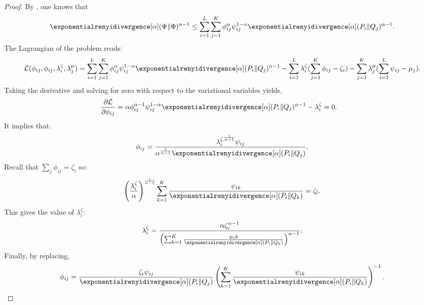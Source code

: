\begin{proof}
    By , one knows that
    \begin{align*}
        \exponentialrenyidivergence[\alpha](\Psi\Vert\Phi)^{\alpha-1}\leq\sum_{i=1}^{L}\sum_{j=1}^K \phi_{ij}^\alpha \psi_{ij}^{1-\alpha} \exponentialrenyidivergence[\alpha](P_i\Vert Q_j)^{\alpha-1}.
    \end{align*}
    The Lagrangian of the problem reads:
    \begin{align*}
        \mathcal{L}(\phi_{ij},\phi_{ij},\lambda_i^{\zeta},\lambda_j^{\mu})=\sum_{i=1}^{L}\sum_{j=1}^K \phi_{ij}^\alpha \psi_{ij}^{1-\alpha} \exponentialrenyidivergence[\alpha](P_i\Vert Q_j)^{\alpha-1} - \sum_{i=1}^L \lambda_i^{\zeta} (\sum_{j=1}^K \phi_{ij} - \zeta_i)
        - \sum_{j=1}^K \lambda_j^{\mu} (\sum_{i=1}^L \psi_{ij} - \mu_j).
    \end{align*}
    Taking the derivative and solving for zero with respect to the variational variables yields,
    \begin{align*}
        \frac{\partial \mathcal{L}}{\partial \phi_{ij}} &= \alpha \phi_{ij}^{\alpha-1} \psi_{ij}^{1-\alpha} \exponentialrenyidivergence[\alpha] (P_i\Vert Q_j)^{\alpha-1}-\lambda_i^{\zeta} =0.
    \end{align*}
    It implies that: 
    \begin{align*}
        \phi_{ij} = \frac{{\lambda_i^{\zeta}}^{\frac{1}{\alpha-1}}\psi_{ij}}{\alpha^{\frac{1}{\alpha-1}} \exponentialrenyidivergence[\alpha](P_i\Vert Q_j)}.
    \end{align*}
    Recall that $\sum_{j}\phi_{ij}=\zeta_i$ so:
    \begin{align*}
        \left(\frac{{\lambda_i^{\zeta}}}{\alpha}\right)^{\frac{1}{\alpha-1}} \sum_{k=1}^K \frac{\psi_{ik}}{\exponentialrenyidivergence[\alpha](P_i\Vert Q_k)} = \zeta_l.
    \end{align*}
    This gives the value of $\lambda_i^{\zeta}$:
    \begin{align*}
        \lambda_i^{\zeta} = \frac{\alpha \zeta_i^{\alpha-1}}{\left(\sum_{k=1}^K\frac{\psi_ik}{\exponentialrenyidivergence[\alpha](P_i\Vert Q_k)}\right)^{\alpha-1}}.
    \end{align*}
    Finally, by replacing,
    \begin{align*}
        \phi_{ij} = \frac{\zeta_i \psi_{ij}}{ \exponentialrenyidivergence[\alpha](P_i\Vert Q_j)} \left(\sum_{k=1}^K\frac{\psi_{ik}}{\exponentialrenyidivergence[\alpha](P_i\Vert Q_k)}\right)^{-1}.
    \end{align*}

\end{proof}
